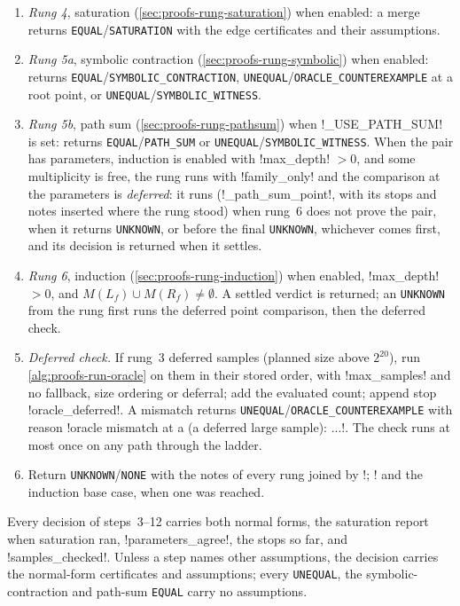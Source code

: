 \begin{algorithm}
\begin{enumerate}
\item \emph{Rung 4}, saturation (\cref{sec:proofs-rung-saturation}) when enabled: a merge returns \texttt{EQUAL}/\allowbreak\texttt{SATURATION} with the edge certificates and their assumptions.
\item \emph{Rung 5a}, symbolic contraction (\cref{sec:proofs-rung-symbolic}) when enabled: returns \texttt{EQUAL}/\allowbreak\texttt{SYMBOLIC\_CONTRACTION}, \texttt{UNEQUAL}/\allowbreak\texttt{ORACLE\_COUNTEREXAMPLE} at a root point, or \texttt{UNEQUAL}/\allowbreak\texttt{SYMBOLIC\_WITNESS}.
\item \emph{Rung 5b}, path sum (\cref{sec:proofs-rung-pathsum}) when \py!_USE_PATH_SUM! is set: returns \texttt{EQUAL}/\allowbreak\texttt{PATH\_SUM} or \texttt{UNEQUAL}/\allowbreak\texttt{SYMBOLIC\_WITNESS}. When the pair has parameters, induction is enabled with \py!max_depth! $>0$, and some multiplicity is free, the rung runs with \py!family_only! and the comparison at the parameters is \emph{deferred}: it runs (\py!_path_sum_point!, with its stops and notes inserted where the rung stood) when rung~6 does not prove the pair, when it returns \texttt{UNKNOWN}, or before the final \texttt{UNKNOWN}, whichever comes first, and its decision is returned when it settles.
\item \emph{Rung 6}, induction (\cref{sec:proofs-rung-induction}) when enabled, \py!max_depth! $>0$, and $M(L_f)\cup M(R_f)\neq\emptyset$. A settled verdict is returned; an \texttt{UNKNOWN} from the rung first runs the deferred point comparison, then the deferred check.
\item \emph{Deferred check.} If rung~3 deferred samples (planned size above $2^{20}$), run \cref{alg:proofs-run-oracle} on them in their stored order, with \py!max_samples! and no fallback, size ordering or deferral; add the evaluated count; append stop \code!oracle_deferred!. A mismatch returns \texttt{UNEQUAL}/\allowbreak\texttt{ORACLE\_COUNTEREXAMPLE} with reason \code!oracle mismatch at {a} (a deferred large sample): ...!. The check runs at most once on any path through the ladder.
\item Return \texttt{UNKNOWN}/\allowbreak\texttt{NONE} with the notes of every rung joined by \code!; ! and the induction base case, when one was reached.
\end{enumerate}
Every decision of steps~3--12 carries both normal forms, the saturation report when saturation ran, \py!parameters_agree!, the stops so far, and \py!samples_checked!. Unless a step names other assumptions, the decision carries the normal-form certificates and assumptions; every \texttt{UNEQUAL}, the symbolic-contraction and path-sum \texttt{EQUAL} carry no assumptions.
\end{algorithm}

